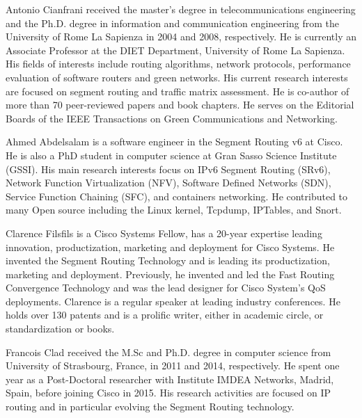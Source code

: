 \documentclass[10pt,journal,twocolumn]{IEEEtran}
\begin{document}
{\begin{IEEEbiography}{Antonio Cianfrani} received the master's degree in telecommunications engineering and the Ph.D. degree in information and communication engineering from the University of Rome La Sapienza in 2004 and 2008, respectively. He is currently an Associate Professor at the DIET Department, University of Rome La Sapienza. His fields of interests include routing algorithms, network protocols, performance evaluation of software routers and green networks. His current research interests are focused on segment routing and traffic matrix assessment. He is co-author of more than 70 peer-reviewed papers and book chapters. He serves on the Editorial Boards of the IEEE Transactions on Green Communications and Networking.
\end{IEEEbiography}
\begin{IEEEbiography}{Ahmed Abdelsalam} is a software engineer in the Segment Routing v6 at Cisco. He is also a PhD student in computer science at Gran Sasso Science Institute (GSSI). His main research interests focus on IPv6 Segment Routing (SRv6), Network Function Virtualization (NFV), Software Defined Networks (SDN), Service Function Chaining (SFC), and containers networking. He contributed to many Open source including the Linux kernel, Tcpdump, IPTables, and Snort.
\end{IEEEbiography}
\begin{IEEEbiography}{Clarence Filsfils}
is a Cisco Systems Fellow, has a 20-year expertise leading innovation, productization, marketing and deployment for Cisco Systems. He invented the Segment Routing Technology and is leading its productization, marketing and deployment. Previously, he invented and led the Fast Routing Convergence Technology and was the lead designer for Cisco System's QoS deployments. Clarence is a regular speaker at leading industry conferences. He holds over 130 patents and is a prolific writer, either in academic circle, or standardization or books.
\end{IEEEbiography}
\begin{IEEEbiography}{Francois Clad} received the M.Sc and Ph.D. degree in computer science from University of Strasbourg, France, in 2011 and 2014, respectively. He spent one year as a Post-Doctoral researcher with Institute IMDEA Networks, Madrid, Spain, before joining Cisco in 2015. His research activities are focused on IP routing and in particular evolving the Segment Routing technology.

\end{IEEEbiography}}
\end{document}
